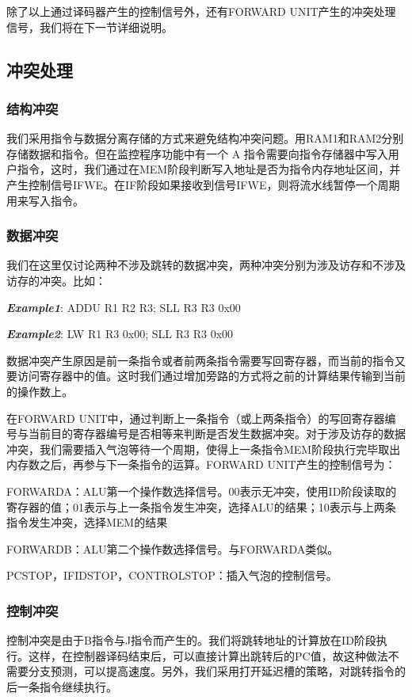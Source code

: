 除了以上通过译码器产生的控制信号外，还有FORWARD UNIT产生的冲突处理信号，我们将在下一节详细说明。

\subsection{冲突处理}
\subsubsection{结构冲突}
我们采用指令与数据分离存储的方式来避免结构冲突问题。用RAM1和RAM2分别存储数据和指令。但在监控程序功能中有一个 A 指令需要向指令存储器中写入用户指令，这时，我们通过在MEM阶段判断写入地址是否为指令内存地址区间，并产生控制信号IFWE。在IF阶段如果接收到信号IFWE，则将流水线暂停一个周期用来写入指令。

\subsubsection{数据冲突}
我们在这里仅讨论两种不涉及跳转的数据冲突，两种冲突分别为涉及访存和不涉及访存的冲突。比如：

\textbf{\textit{Example1}}: \quad ADDU R1 R2 R3; \quad SLL R3 R3 0x00

\textbf{\textit{Example2}}: \quad LW R1 R3 0x00; \quad SLL R3 R3 0x00

数据冲突产生原因是前一条指令或者前两条指令需要写回寄存器，而当前的指令又要访问寄存器中的值。这时我们通过增加旁路的方式将之前的计算结果传输到当前的操作数上。

在FORWARD UNIT中，通过判断上一条指令（或上两条指令）的写回寄存器编号与当前目的寄存器编号是否相等来判断是否发生数据冲突。对于涉及访存的数据冲突，我们需要插入气泡等待一个周期，使得上一条指令MEM阶段执行完毕取出内存数之后，再参与下一条指令的运算。FORWARD UNIT产生的控制信号为：

FORWARDA：ALU第一个操作数选择信号。00表示无冲突，使用ID阶段读取的寄存器的值；01表示与上一条指令发生冲突，选择ALU的结果；10表示与上两条指令发生冲突，选择MEM的结果

FORWARDB：ALU第二个操作数选择信号。与FORWARDA类似。

PCSTOP，IFIDSTOP，CONTROLSTOP：插入气泡的控制信号。

\subsubsection{控制冲突}

控制冲突是由于B指令与J指令而产生的。我们将跳转地址的计算放在ID阶段执行。这样，在控制器译码结束后，可以直接计算出跳转后的PC值，故这种做法不需要分支预测，可以提高速度。另外，我们采用打开延迟槽的策略，对跳转指令的后一条指令继续执行。

